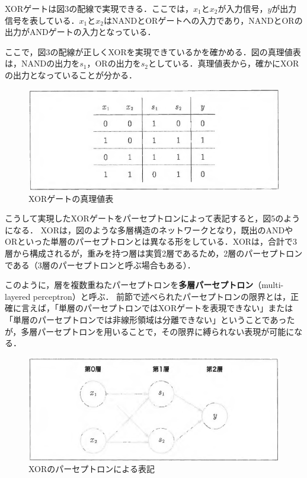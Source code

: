 \documentclass[dvipdfmx]{jsarticle}
\begin{document}
\newpage
XORゲートは図3の配線で実現できる．ここでは，$x_1$と$x_2$が入力信号，$y$が出力信号を表している．$x_1$と$x_2$はNANDとORゲートへの入力であり，NANDとORの出力がANDゲートの入力となっている．

ここで，図3の配線が正しくXORを実現できているかを確かめる．図の真理値表は，NANDの出力を$s_1$，ORの出力を$s_2$としている．真理値表から，確かにXORの出力となっていることが分かる．

\begin{figure}[htbp]
\begin{center}
\includegraphics[width=\linewidth]{spring_lec/dp_xor_chart.png}
\end{center}
\caption{XORゲートの真理値表}
\end{figure}

こうして実現したXORゲートをパーセプトロンによって表記すると，図5のようになる．
XORは，図のような多層構造のネットワークとなり，既出のANDやORといった単層のパーセプトロンとは異なる形をしている．XORは，合計で3層から構成されるが，重みを持つ層は実質2層であるため，2層のパーセプトロンである（3層のパーセプトロンと呼ぶ場合もある）．

このように，層を複数重ねたパーセプトロンを\textbf{多層パーセプトロン}（multi-layered perceptron）と呼ぶ．
前節で述べられたパーセプトロンの限界とは，正確に言えば，「単層のパーセプトロンではXORゲートを表現できない」または「単層のパーセプトロンでは非線形領域は分離できない」ということであったが，多層パーセプトロンを用いることで，その限界に縛られない表現が可能になる．

\begin{figure}[H]
\begin{center}
\includegraphics[width=\linewidth]{spring_lec/dp_multi.png}
\end{center}
\caption{XORのパーセプトロンによる表記}
\end{figure}
\end{document}
